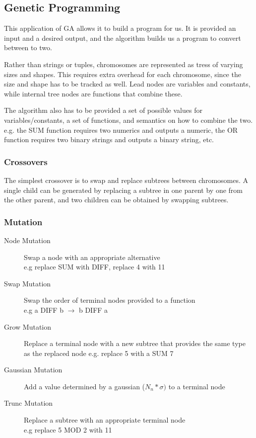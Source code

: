 \subsection{Genetic Programming}
This application of GA allows it to build a program for us. It is provided an input and a desired output, and the algorithm builds us a program to convert between to two.

Rather than strings or tuples, chromosomes are represented as tress of varying sizes and shapes. This requires extra overhead for each chromosome, since the size and shape has to be tracked as well.
Lead nodes are variables and constants, while internal tree nodes are functions that combine these.

The algorithm also has to be provided a set of possible values for variables/constants, a set of functions, and semantics on how to combine the two. e.g. the SUM function requires two numerics and outputs a numeric, the OR function requires two binary strings and outputs a binary string, etc.

\subsubsection{Crossovers}
The simplest crossover is to swap and replace subtrees between chromosomes. A single child can be generated by replacing a subtree in one parent by one from the other parent, and two children can be obtained by swapping subtrees.

\subsubsection{Mutation}
\begin{description}
    \item [Node Mutation] Swap a node with an appropriate alternative\\ e.g replace SUM with DIFF, replace 4 with 11
    \item[Swap Mutation] Swap the order of terminal nodes provided to a function\\ e.g a DIFF b $\rightarrow$ b DIFF a
    \item[Grow Mutation] Replace a terminal node with a new subtree that provides the same type as the replaced node e.g. replace 5 with a SUM 7
    \item[Gaussian Mutation] Add a value determined by a gaussian ($N_n * \sigma)$ to a terminal node
    \item[Trunc Mutation] Replace a subtree with an appropriate terminal node\\e.g replace 5 MOD 2 with 11
\end{description}